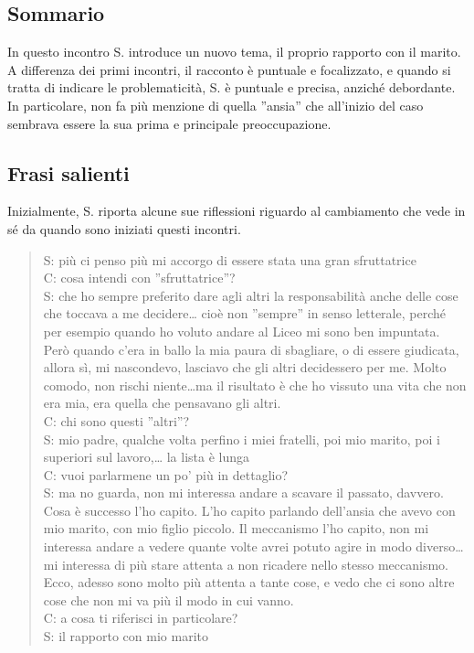 \subsection*{Sommario}

In questo incontro S. introduce un nuovo tema, il proprio rapporto con il marito. A differenza dei primi incontri, il racconto è puntuale e focalizzato, e quando si tratta di indicare le problematicità, S. è puntuale e precisa, anziché debordante. In particolare, non fa più menzione di quella ''ansia'' che all'inizio del caso sembrava essere la sua prima e principale preoccupazione.

\subsection*{Frasi salienti}

Inizialmente, S. riporta alcune sue riflessioni riguardo al cambiamento che vede in sé da quando sono iniziati questi incontri.

\begin{verse}
S: più ci penso più mi accorgo di essere stata una gran sfruttatrice\\
C: cosa intendi con ''sfruttatrice''?\\
S: che ho sempre preferito dare agli altri la responsabilità anche delle cose che toccava a me decidere\ldots{} cioè non ''sempre'' in senso letterale, perché per esempio quando ho voluto andare al Liceo mi sono ben impuntata. Però quando c'era in ballo la mia paura di sbagliare, o di essere giudicata, allora sì, mi nascondevo, lasciavo che gli altri decidessero per me. Molto comodo, non rischi niente\ldots ma il risultato è che ho vissuto una vita che non era mia, era quella che pensavano gli altri.\\
C: chi sono questi ''altri''?\\
S: mio padre, qualche volta perfino i miei fratelli, poi mio marito, poi i superiori sul lavoro,\ldots{} la lista è lunga\\
C: vuoi parlarmene un po' più in dettaglio?\\
S: ma no guarda, non mi interessa andare a scavare il passato, davvero. Cosa è successo l'ho capito. L'ho capito parlando dell'ansia che avevo con mio marito, con mio figlio piccolo. Il meccanismo l'ho capito, non mi interessa andare a vedere quante volte avrei potuto agire in modo diverso\ldots{} mi interessa di più stare attenta a non ricadere nello stesso meccanismo. Ecco, adesso sono molto più attenta a tante cose, e vedo che ci sono altre cose che non mi va più il modo in cui vanno.\\
C: a cosa ti riferisci in particolare?\\
S: il rapporto con mio marito\\
\end{verse}

